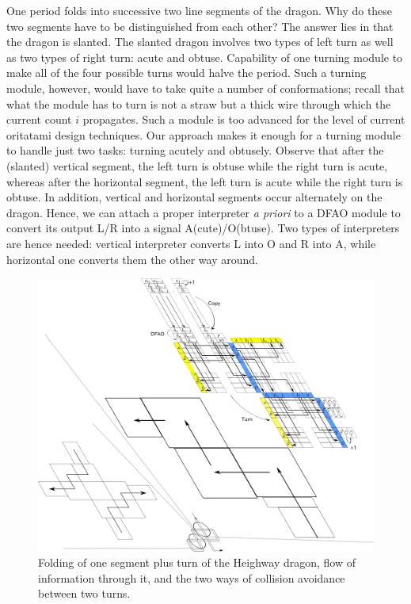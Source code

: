 One period folds into successive two line segments of the dragon. 
Why do these two segments have to be distinguished from each other? 
The answer lies in that the dragon is slanted. 
The slanted dragon involves two types of left turn as well as two types of right turn: acute and obtuse. 
Capability of one turning module to make all of the four possible turns would halve the period. 
Such a turning module, however, would have to take quite a number of conformations; recall that what the module has to turn is not a straw but a thick wire through which the current count $i$ propagates. 
Such a module is too advanced for the level of current oritatami design techniques.  
Our approach makes it enough for a turning module to handle just two tasks: turning acutely and obtusely. 
Observe that after the (slanted) vertical segment, the left turn is obtuse while the right turn is acute, whereas after the horizontal segment, the left turn is acute while the right turn is obtuse. 
In addition, vertical and horizontal segments occur alternately on the dragon. 
Hence, we can attach a proper interpreter \textit{a priori} to a DFAO module to convert its output L/R into a signal A(cute)/O(btuse). 
Two types of interpreters are hence needed: vertical interpreter converts L into O and R into A, while horizontal one converts them the other way around. 

\begin{figure}[tb]
\includegraphics[width=\linewidth]{pic/dragon_vol4.pdf}
\caption{
Folding of one segment plus turn of the Heighway dragon, flow of information through it, and the two ways of collision avoidance between two turns.
}
\label{fig:abst_dragon}
\end{figure}

